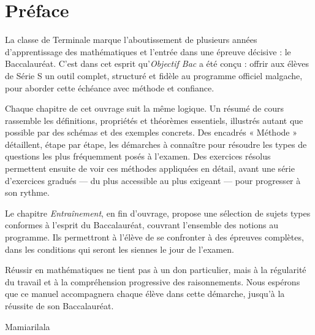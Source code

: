 \chapter*{Préface}

La classe de Terminale marque l'aboutissement de plusieurs années d'apprentissage des mathématiques et l'entrée dans une épreuve décisive : le Baccalauréat. C'est dans cet esprit qu'\emph{Objectif Bac} a été conçu : offrir aux élèves de Série S un outil complet, structuré et fidèle au programme officiel malgache, pour aborder cette échéance avec méthode et confiance.

Chaque chapitre de cet ouvrage suit la même logique. Un résumé de cours rassemble les définitions, propriétés et théorèmes essentiels, illustrés autant que possible par des schémas et des exemples concrets. Des encadrés « Méthode » détaillent, étape par étape, les démarches à connaître pour résoudre les types de questions les plus fréquemment posés à l'examen. Des exercices résolus permettent ensuite de voir ces méthodes appliquées en détail, avant une série d'exercices gradués — du plus accessible au plus exigeant — pour progresser à son rythme.

Le chapitre \emph{Entraînement}, en fin d'ouvrage, propose une sélection de sujets types conformes à l'esprit du Baccalauréat, couvrant l'ensemble des notions au programme. Ils permettront à l'élève de se confronter à des épreuves complètes, dans les conditions qui seront les siennes le jour de l'examen.

Réussir en mathématiques ne tient pas à un don particulier, mais à la régularité du travail et à la compréhension progressive des raisonnements. Nous espérons que ce manuel accompagnera chaque élève dans cette démarche, jusqu'à la réussite de son Baccalauréat.

\bigskip
\begin{flushright}
Mamiarilala
\end{flushright}
